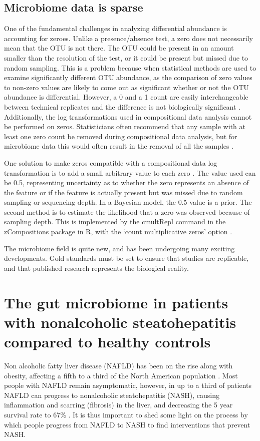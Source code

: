 \subsection{Microbiome data is sparse}
One of the fundamental challenges in analyzing differential abundance is accounting for zeroes. Unlike a presence/absence test, a zero does not necessarily mean that the OTU is not there. The OTU could be present in an amount smaller than the resolution of the test, or it could be present but missed due to random sampling. This is a problem because when statistical methods are used to examine significantly different OTU abundance, as the comparison of zero values to non-zero values are likely to come out as significant whether or not the OTU abundance is differential. However, a 0 and a 1 count are easily interchangeable between technical replicates and the difference is not biologically significant \cite{gloor2016s} \cite{fernandes2013anova} \cite{fernandes2014unifying}. Additionally, the log transformations used in compositional data analysis cannot be performed on zeros. Statisticians often recommend that any sample with at least one zero count be removed during compositional data analysis, but for microbiome data this would often result in the removal of all the samples \cite{aitchison1982statistical}.

One solution to make zeros compatible with a compositional data log transformation is to add a small arbitrary value to each zero \cite{aitchison1982statistical}. The value used can be 0.5, representing uncertainty as to whether the zero represents an absence of the feature or if the feature is actually present but was missed due to random sampling or sequencing depth. In a Bayesian model, the 0.5 value is a prior. The second method is to estimate the likelihood that a zero was observed because of sampling depth. This is implemented by the cmultRepl command in the zCompositions package in R, with the `count multiplicative zeros' option \cite{palarea2015zcompositions}.

The microbiome field is quite new, and has been undergoing many exciting developments. Gold standards must be set to ensure that studies are replicable, and that published research represents the biological reality.

\section{The gut microbiome in patients with nonalcoholic steatohepatitis compared to healthy controls}
Non alcoholic fatty liver disease (NAFLD) has been on the rise along with obesity, affecting a fifth to a third of the North American population \cite{preiss2008non}. Most people with NAFLD remain asymptomatic, however, in up to a third of patients NAFLD can progress to nonalcoholic steatohepatitis (NASH), causing inflammation and scarring (fibrosis) in the liver, and decreasing the 5 year survival rate to 67\% \cite{propst1995prognosis}. It is thus important to shed some light on the process by which people progress from NAFLD to NASH to find interventions that prevent NASH.


